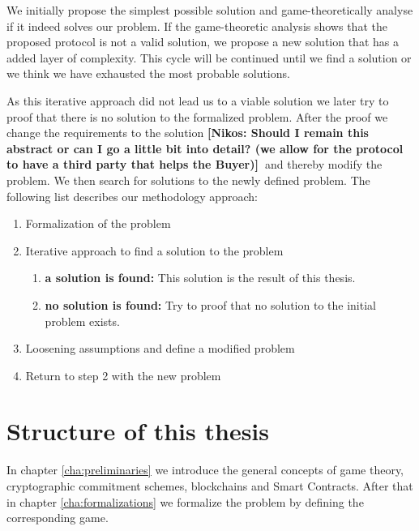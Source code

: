 \documentclass{cacthesis}
\newcommand{\authnote}[3]{{ \footnotesize \textbf{#1[#2: #3]~}}}
\newcommand{\niknote}[1]{\authnote{\color{red}}{Nikos}{#1}}
\begin{document}
	We initially propose the simplest possible solution and game-theoretically analyse if it indeed solves our problem. 
	If the game-theoretic analysis shows that the proposed protocol is not a valid solution, we propose a new solution that has a added layer of complexity. This cycle will be continued until we find a solution or we think we have exhausted the most probable solutions. \newline
	
	As this iterative approach did not lead us to a viable solution we later try to proof that there is no solution to the formalized problem. After the proof we change the requirements to the solution \niknote{Should I remain this abstract or can I go a little bit into detail? (we allow for the protocol to have a third party that helps the Buyer)}and thereby modify the problem. We then search for solutions to the newly defined problem. The following list describes our methodology approach:

	\begin{enumerate}
	    \item Formalization of the problem \label{step:1}
	    \item Iterative approach to find a solution to the problem \label{step:2}
	            \begin{enumerate}
	            \item \textbf{a solution is found:} This solution is the result of this thesis. \label{step:solution}
	           \item \textbf{no solution is found:} Try to proof that no solution to the initial problem exists. \label{step:proof}
	        \end{enumerate}
	    \item Loosening assumptions and define a modified problem \label{step:modified-problem}
	    \item Return to step 2 with the new problem\label{step:return2}
	\end{enumerate}

	\section{Structure of this thesis}
	In chapter \ref{cha:preliminaries} we introduce the general concepts of game theory, cryptographic commitment schemes, blockchains and Smart Contracts.  After that in chapter \ref{cha:formalizations} we formalize the problem by defining the corresponding game.\newline %
	
\end{document}
